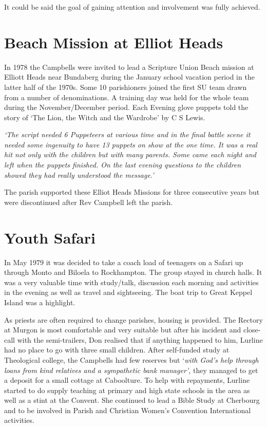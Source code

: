It could be said the goal of gaining attention and involvement was fully achieved.

\hypertarget{beach-mission-at-elliot-heads}{%
\section{Beach Mission at Elliot Heads}\label{beach-mission-at-elliot-heads}}

In 1978 the Campbells were invited to lead a Scripture Union Beach mission at Elliott Heads near Bundaberg during the January school vacation period in the latter half of the 1970s. Some 10 parishioners joined the first SU team drawn from a number of denominations. A training day was held for the whole team during the November/December period. Each Evening glove puppets told the story of `The Lion, the Witch and the Wardrobe' by C S Lewis.

\emph{`The script needed 6 Puppeteers at various time and in the final battle scene it needed some ingenuity to have 13 puppets on show at the one time. It was a real hit not only with the children but with many parents. Some came each night and left when the puppets finished. On the last evening questions to the children showed they had really understood the message.'}

The parish supported these Elliot Heads Missions for three consecutive years but were discontinued after Rev Campbell left the parish.

\hypertarget{youth-safari}{%
\section{Youth Safari}\label{youth-safari}}

In May 1979 it was decided to take a coach load of teenagers on a Safari up through Monto and Biloela to Rockhampton. The group stayed in church halls. It was a very valuable time with study/talk, discussion each morning and activities in the evening as well as travel and sightseeing. The boat trip to Great Keppel Island was a highlight.

As priests are often required to change parishes, housing is provided. The Rectory at Murgon is most comfortable and very suitable but after his incident and close-call with the semi-trailers, Don realised that if anything happened to him, Lurline had no place to go with three small children. After self-funded study at Theological college, the Campbells had few reserves but `\emph{with God's help through loans from kind relatives and a sympathetic bank manager',} they managed to get a deposit for a small cottage at Caboolture. To help with repayments, Lurline started to do supply teaching at primary and high state schools in the area as well as a stint at the Convent. She continued to lead a Bible Study at Cherbourg and to be involved in Parish and Christian Women's Convention International activities.


